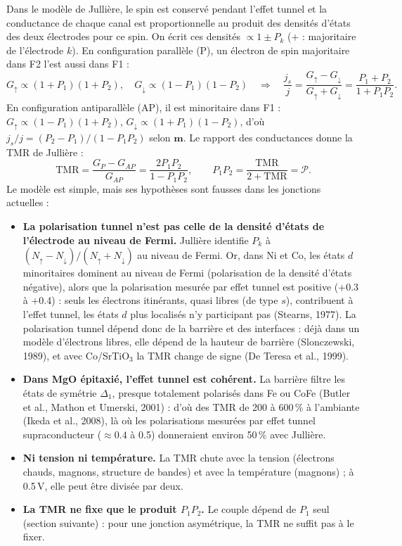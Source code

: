 \documentclass[11pt,a4paper]{article}
\newcommand{\vm}{\bm{m}}
\begin{document}
Dans le modèle de Jullière, le spin est conservé pendant l'effet tunnel et
la conductance de chaque canal est proportionnelle au produit des
densités d'états des deux électrodes pour ce spin. On écrit ces densités
$\propto 1\pm P_k$ ($+$ : majoritaire de l'électrode $k$). En
configuration parallèle (P), un électron de spin majoritaire dans F2 l'est
aussi dans F1 :
\begin{equation}
  G_\uparrow\propto(1+P_1)(1+P_2),\quad
  G_\downarrow\propto(1-P_1)(1-P_2)
  \quad\Rightarrow\quad
  \frac{j_s}{j} = \frac{G_\uparrow - G_\downarrow}{G_\uparrow + G_\downarrow}
  = \frac{P_1+P_2}{1+P_1P_2} .
\end{equation}
En configuration antiparallèle (AP), il est minoritaire dans F1 :
$G_\uparrow\propto(1-P_1)(1+P_2)$, $G_\downarrow\propto(1+P_1)(1-P_2)$,
d'où $j_s/j = (P_2-P_1)/(1-P_1P_2)$ selon $\vm$. Le rapport des
conductances donne la TMR de Jullière :
\begin{equation}
  \mathrm{TMR} = \frac{G_P - G_{AP}}{G_{AP}} = \frac{2P_1P_2}{1-P_1P_2},
  \qquad
  P_1P_2 = \frac{\mathrm{TMR}}{2+\mathrm{TMR}} = \mathcal{P} .
\end{equation}
Le modèle est simple, mais ses hypothèses sont fausses dans les jonctions
actuelles :
\begin{itemize}
  \item \textbf{La polarisation tunnel n'est pas celle de la densité
    d'états de l'électrode au niveau de Fermi.} Jullière identifie $P_k$ à
    $(N_\uparrow-N_\downarrow)/(N_\uparrow+N_\downarrow)$ au niveau de
    Fermi. Or, dans Ni et Co, les états $d$ minoritaires dominent au niveau
    de Fermi (polarisation de la densité d'états négative), alors que la
    polarisation mesurée par effet tunnel est positive (+0.3 à +0.4) :
    seuls les électrons itinérants, quasi libres (de type $s$), contribuent
    à l'effet tunnel, les états $d$ plus localisés n'y participant pas
    (Stearns, 1977). La polarisation tunnel dépend
    donc de la barrière et des interfaces : déjà dans un modèle d'électrons
    libres, elle dépend de la hauteur de barrière (Slonczewski, 1989), et
    avec Co/SrTiO$_3$ la TMR change de signe (De Teresa et al., 1999).
  \item \textbf{Dans MgO épitaxié, l'effet tunnel est cohérent.} La
    barrière filtre les états de symétrie $\Delta_1$, presque totalement
    polarisés dans Fe ou CoFe (Butler et al., Mathon et Umerski, 2001) :
    d'où des TMR de 200 à 600\,\% à l'ambiante (Ikeda et al., 2008), là où
    les polarisations mesurées par effet tunnel supraconducteur
    ($\approx0.4$ à 0.5) donneraient environ 50\,\% avec Jullière.
  \item \textbf{Ni tension ni température.} La TMR chute avec la tension
    (électrons chauds, magnons, structure de bandes) et avec la température
    (magnons) ; à 0.5\,V, elle peut être divisée par deux.
  \item \textbf{La TMR ne fixe que le produit $P_1P_2$.} Le couple dépend
    de $P_1$ seul (section suivante) : pour une jonction asymétrique, la
    TMR ne suffit pas à le fixer.
\end{itemize}
\end{document}

